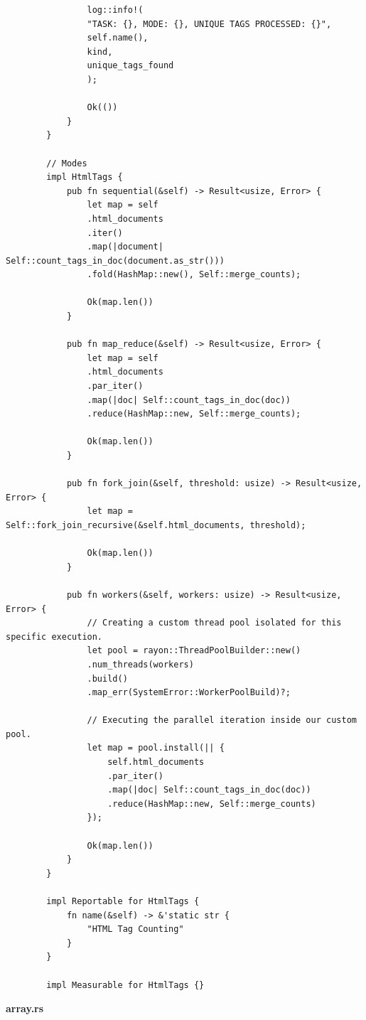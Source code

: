 \documentclass[14pt, a4paper]{extreport}
\begin{document}
\begin{verbatim}
				log::info!(
				"TASK: {}, MODE: {}, UNIQUE TAGS PROCESSED: {}",
				self.name(),
				kind,
				unique_tags_found
				);
				
				Ok(())
			}
		}
		
		// Modes
		impl HtmlTags {
			pub fn sequential(&self) -> Result<usize, Error> {
				let map = self
				.html_documents
				.iter()
				.map(|document| Self::count_tags_in_doc(document.as_str()))
				.fold(HashMap::new(), Self::merge_counts);
				
				Ok(map.len())
			}
			
			pub fn map_reduce(&self) -> Result<usize, Error> {
				let map = self
				.html_documents
				.par_iter()
				.map(|doc| Self::count_tags_in_doc(doc))
				.reduce(HashMap::new, Self::merge_counts);
				
				Ok(map.len())
			}
			
			pub fn fork_join(&self, threshold: usize) -> Result<usize, Error> {
				let map = Self::fork_join_recursive(&self.html_documents, threshold);
				
				Ok(map.len())
			}
			
			pub fn workers(&self, workers: usize) -> Result<usize, Error> {
				// Creating a custom thread pool isolated for this specific execution.
				let pool = rayon::ThreadPoolBuilder::new()
				.num_threads(workers)
				.build()
				.map_err(SystemError::WorkerPoolBuild)?;
				
				// Executing the parallel iteration inside our custom pool.
				let map = pool.install(|| {
					self.html_documents
					.par_iter()
					.map(|doc| Self::count_tags_in_doc(doc))
					.reduce(HashMap::new, Self::merge_counts)
				});
				
				Ok(map.len())
			}
		}
		
		impl Reportable for HtmlTags {
			fn name(&self) -> &'static str {
				"HTML Tag Counting"
			}
		}
		
		impl Measurable for HtmlTags {}
	\end{verbatim}
	
	\textbf{array.rs}
	
\end{document}
